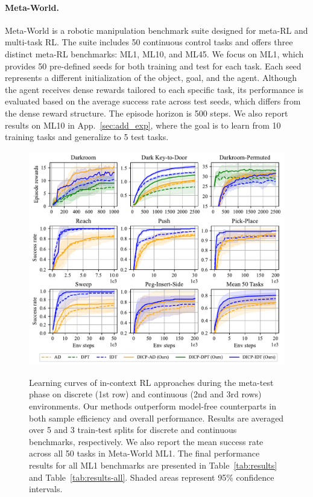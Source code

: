 \documentclass{article}
\begin{document}
\paragraph*{Meta-World.}
Meta-World \citep{MW} is a robotic manipulation benchmark suite designed for meta-RL and multi-task RL.
The suite includes 50 continuous control tasks and offers three distinct meta-RL benchmarks: ML1, ML10, and ML45.
We focus on ML1, which provides 50 pre-defined seeds for both training and test for each task.
Each seed represents a different initialization of the object, goal, and the agent.
Although the agent receives dense rewards tailored to each specific task, its performance is evaluated based on the average success rate across test seeds, which differs from the dense reward structure.
The episode horizon is 500 steps.
We also report results on ML10 in App.~\ref{sec:add_exp}, where the goal is to learn from 10 training tasks and generalize to 5 test tasks.


\begin{figure}[t]
    \begin{center}
        \includegraphics[width=\linewidth]{figures/curve.pdf} \\
    \end{center}
    \caption{Learning curves of in-context RL approaches during the meta-test phase on discrete (1st row) and continuous (2nd and 3rd rows) environments.
    Our methods outperform model-free counterparts in both sample efficiency and overall performance.
    Results are averaged over 5 and 3 train-test splits for discrete and continuous benchmarks, respectively.
    We also report the mean success rate across all 50 tasks in Meta-World ML1.
    The final performance results for all ML1 benchmarks are presented in Table~\ref{tab:results} and Table~\ref{tab:results-all}.
    Shaded areas represent 95\% confidence intervals.
    }
    \label{fig:curve}
\end{figure}
\end{document}
